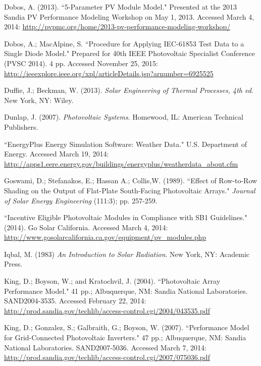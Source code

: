 \documentclass[12pt,letterpaper]{article}
\begin{document}
\begin{thebibliography}{99}
 Dobos, A. (2013). ``5-Parameter PV Module Model." Presented at the 2013 Sandia PV Performance Modeling Workshop on May 1, 2013. Accessed March 4, 2014: \url{http://pvpmc.org/home/2013-pv-performance-modeling-workshop/}

 Dobos, A.; MacAlpine, S. ``Procedure for Applying IEC-61853 Test Data to a Single Diode Model." Prepared for 40th IEEE Photovoltaic Specialist Conference (PVSC 2014). 4 pp. Accessed November 25, 2015: \url{http://ieeexplore.ieee.org/xpl/articleDetails.jsp?arnumber=6925525}

 Duffie, J.; Beckman, W. (2013). \textit{Solar Engineering of Thermal Processes, 4th ed}. New York, NY: Wiley.

 Dunlap, J. (2007). \textit{Photovoltaic Systems}. Homewood, IL: American Technical Publishers.

 ``EnergyPlus Energy Simulation Software: Weather Data." U.S. Department of Energy. Accessed March 19, 2014: \url{http://apps1.eere.energy.gov/buildings/energyplus/weatherdata_about.cfm}

 Goswami, D.; Stefanakos, E.; Hassan A.; Collis,W. (1989). ``Effect of Row-to-Row Shading on the Output of Flat-Plate South-Facing Photovoltaic Arrays." \textit{Journal of Solar Energy Engineering} (111:3); pp. 257-259.

 ``Incentive Eligible Photovoltaic Modules in Compliance with SB1 Guidelines." (2014). Go Solar California. Accessed March 4, 2014: \url{http://www.gosolarcalifornia.ca.gov/equipment/pv_modules.php}

 Iqbal, M. (1983) \textit{An Introduction to Solar 
Radiation}. New York, NY: Academic Press.

  King, D.; Boyson, W.; and Kratochvil, J. (2004). ``Photovoltaic Array Performance Model." 41 pp.; Albuquerque, NM: Sandia National Laboratories. SAND2004-3535. Accessed February 22, 2014: \url{http://prod.sandia.gov/techlib/access-control.cgi/2004/043535.pdf}

 King, D.; Gonzalez, S.; Galbraith, G.; Boyson, W. (2007). ``Performance Model for Grid-Connected Photovoltaic Inverters." 47 pp.; Albuquerque, NM: Sandia National Laboratories. SAND2007-5036. Accessed March 7, 2014: \url{http://prod.sandia.gov/techlib/access-control.cgi/2007/075036.pdf}


\end{thebibliography}
\end{document}
